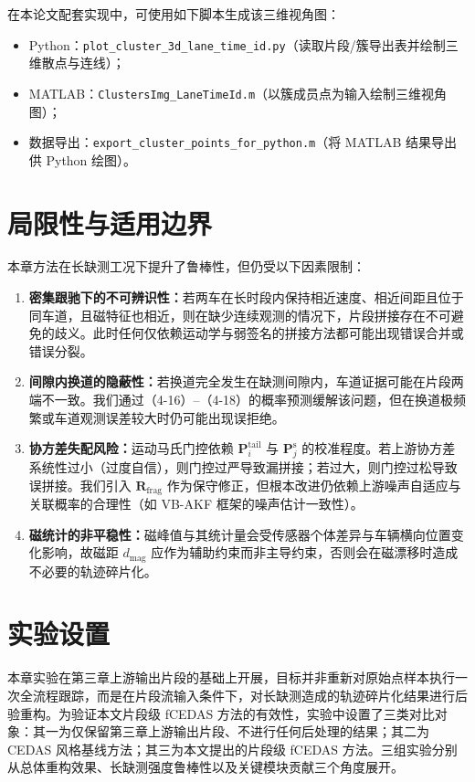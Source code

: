 \documentclass{xdupgthesis}
\begin{document}
在本论文配套实现中，可使用如下脚本生成该三维视角图：
\begin{itemize}
	\item Python：\texttt{plot\_cluster\_3d\_lane\_time\_id.py}（读取片段/簇导出表并绘制三维散点与连线）；
	\item MATLAB：\texttt{ClustersImg\_LaneTimeId.m}（以簇成员点为输入绘制三维视角图）；
	\item 数据导出：\texttt{export\_cluster\_points\_for\_python.m}（将 MATLAB 结果导出供 Python 绘图）。
\end{itemize}

\section{局限性与适用边界}
\label{sec:limitations_zh}
本章方法在长缺测工况下提升了鲁棒性，但仍受以下因素限制：
\begin{enumerate}
	\item \textbf{密集跟驰下的不可辨识性：}若两车在长时段内保持相近速度、相近间距且位于同车道，且磁特征也相近，则在缺少连续观测的情况下，片段拼接存在不可避免的歧义。此时任何仅依赖运动学与弱签名的拼接方法都可能出现错误合并或错误分裂。
	\item \textbf{间隙内换道的隐蔽性：}若换道完全发生在缺测间隙内，车道证据可能在片段两端不一致。我们通过（4-16）--（4-18）的概率预测缓解该问题，但在换道极频繁或车道观测误差较大时仍可能出现误拒绝。
	\item \textbf{协方差失配风险：}运动马氏门控依赖 $\mathbf{P}_i^{\mathrm{tail}}$ 与 $\mathbf{P}_j^{\mathrm{s}}$ 的校准程度。若上游协方差系统性过小（过度自信），则门控过严导致漏拼接；若过大，则门控过松导致误拼接。我们引入 $\mathbf{R}_{\mathrm{frag}}$ 作为保守修正，但根本改进仍依赖上游噪声自适应与关联概率的合理性（如 VB-AKF 框架的噪声估计一致性）。%
	\item \textbf{磁统计的非平稳性：}磁峰值与其统计量会受传感器个体差异与车辆横向位置变化影响，故磁距 $d_{\mathrm{mag}}$ 应作为辅助约束而非主导约束，否则会在磁漂移时造成不必要的轨迹碎片化。
\end{enumerate}



\section{实验设置}

本章实验在第三章上游输出片段的基础上开展，目标并非重新对原始点样本执行一次全流程跟踪，而是在片段流输入条件下，对长缺测造成的轨迹碎片化结果进行后验重构。为验证本文片段级 fCEDAS 方法的有效性，实验中设置了三类对比对象：其一为仅保留第三章上游输出片段、不进行任何后处理的结果；其二为 CEDAS 风格基线方法；其三为本文提出的片段级 fCEDAS 方法。三组实验分别从总体重构效果、长缺测强度鲁棒性以及关键模块贡献三个角度展开。
\end{document}
